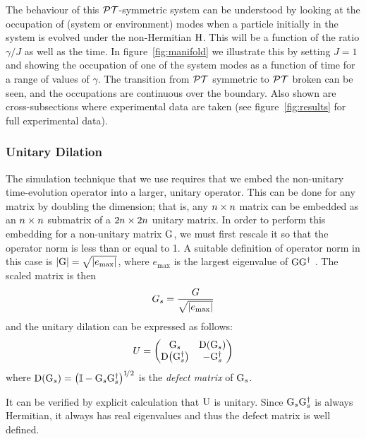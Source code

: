 The behaviour of this \(\mathcal{PT}\)-symmetric system can be understood by looking at
the occupation of (system or environment) modes when a particle initially in the
system is evolved under the non-Hermitian \(\mathrm{H}\). This will be a function
of the ratio \(\gamma/J\) as well as the time. In figure~\ref{fig:manifold} we
illustrate this by setting \(J=1\) and showing the occupation of one of the
system modes as a function of time for a range of values of \(\gamma\). The
transition from \(\mathcal{PT}\) symmetric to \(\mathcal{PT}\) broken can be seen, and the
occupations are continuous over the boundary. Also shown are cross-subsections
where experimental data are taken (see figure~\ref{fig:results} for full
experimental data).

\subsubsection{Unitary Dilation}
The simulation technique that we use requires that we embed the non-unitary
time-evolution operator into a larger, unitary operator. This can be done for
any matrix by doubling the dimension; that is, any \(n \times n\) matrix can be
embedded as an \(n \times n\) submatrix of a \(2n \times 2n\) unitary matrix. In order
to perform this embedding for a non-unitary matrix \(\mathrm{G}\), we must first
rescale it so that the operator norm is less than or equal to 1. A suitable
definition of operator norm in this case is \(\left|\mathrm{G}\right| = \sqrt{\left|e_{
\text{max}}\right|}\), where \(e_{\text{max}}\) is the largest eigenvalue of 
\(\mathrm{GG^{\dagger}}\) \cite{dilation}. The scaled matrix is then
\begin{equation}
  G_{s} = \frac{G}{\sqrt{\left|e_{\text{max}}\right|}}
\end{equation}
and the unitary dilation can be expressed as follows:
\begin{equation}
  U = \begin{pmatrix}
    \mathrm{G}_{s} & \mathrm{D}\!\left(\mathrm{G}_{s}\right) \\
    \mathrm{D}\!\left(\mathrm{G}_{s}^{\dagger}\right) & -\mathrm{G}_{s}^{\dagger} \end{pmatrix}
\end{equation}
where \(\mathrm{D}\!\left(\mathrm{G}_{s}\right) = \left( \mathbb{I} - \mathrm{G}_{s}\mathrm{G}_{s}^{
\dagger} \right)^{1\!/2}
\) is the \emph{defect matrix} of \(\mathrm{G}_{s}\).

It can be verified by explicit calculation that \(\mathrm{U}\) is unitary.
Since \(\mathrm{G}_{s}\mathrm{G}_{s}^{\dagger}\) is always Hermitian, it always has
real eigenvalues and thus the defect matrix is well defined.

